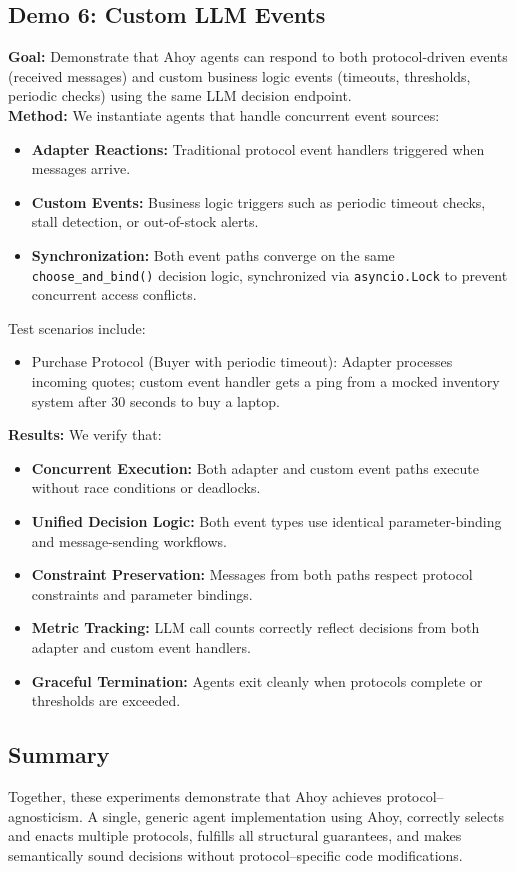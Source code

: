 \documentclass[runningheads]{llncs}
\newcommand{\ahoy}{Ahoy\xspace}
\begin{document}
\subsection{Demo 6: Custom LLM Events}
\textbf{Goal:} Demonstrate that \ahoy agents can respond to both protocol-driven events (received messages) and custom business logic events (timeouts, thresholds, periodic checks) using the same LLM decision endpoint.\\
\textbf{Method:} We instantiate agents that handle concurrent event sources:
\begin{itemize}
    \item \textbf{Adapter Reactions:} Traditional protocol event handlers triggered when messages arrive.
    \item \textbf{Custom Events:} Business logic triggers such as periodic timeout checks, stall detection, or out-of-stock alerts.
    \item \textbf{Synchronization:} Both event paths converge on the same \texttt{choose\_and\_bind()} decision logic, synchronized via \texttt{asyncio.Lock} to prevent concurrent access conflicts.
\end{itemize}
Test scenarios include:
\begin{itemize}
    \item Purchase Protocol (Buyer with periodic timeout): Adapter processes incoming quotes; custom event handler gets a ping from a mocked inventory system after 30 seconds to buy a laptop.
    \end{itemize}
\textbf{Results:} We verify that:
\begin{itemize}
    \item \textbf{Concurrent Execution:} Both adapter and custom event paths execute without race conditions or deadlocks.
    \item \textbf{Unified Decision Logic:} Both event types use identical parameter-binding and message-sending workflows.
    \item \textbf{Constraint Preservation:} Messages from both paths respect protocol constraints and parameter bindings.
    \item \textbf{Metric Tracking:} LLM call counts correctly reflect decisions from both adapter and custom event handlers.
    \item \textbf{Graceful Termination:} Agents exit cleanly when protocols complete or thresholds are exceeded.
\end{itemize}

\subsection{Summary}
Together, these experiments demonstrate that \ahoy achieves protocol--agnosticism.
A single, generic agent implementation using \ahoy, correctly selects and enacts multiple protocols, fulfills all structural guarantees, and makes semantically sound decisions without protocol--specific code modifications.
\end{document}
